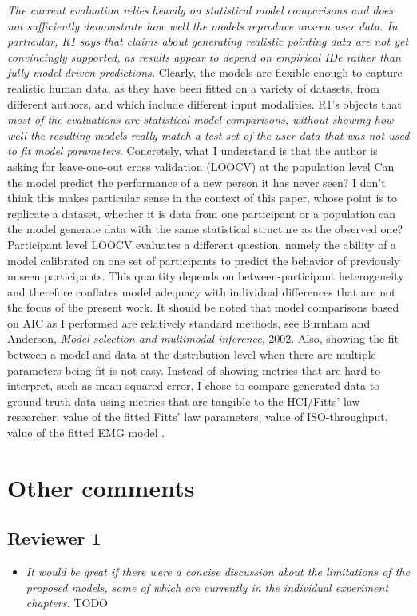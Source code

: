 \documentclass{article}
\begin{document}
\textit{The current evaluation relies heavily on statistical model comparisons and does not sufficiently demonstrate how well the models reproduce unseen user data.  In particular, R1 says that claims about generating realistic pointing data are not yet convincingly supported, as results appear to depend on empirical IDe rather than fully model-driven predictions.} Clearly, the models are flexible enough to capture realistic human data, as they have been fitted on a variety of datasets, from different authors, and which include different input modalities. R1's objects that \textit{most of the evaluations are statistical model comparisons, without showing how well the resulting models really match a test set of the user data that was not used to fit model parameters}. Concretely, what I understand is that the author is asking for leave-one-out cross validation (LOOCV) at the population level \ie Can the model predict the performance of a new person it has never seen? I don't think this makes particular sense in the context of this paper, whose point is to replicate a dataset, whether it is data from one participant or a population \ie can the model generate data with the same statistical structure as the observed one?
Participant level LOOCV evaluates a different question, namely the ability of a model calibrated on one set of participants to predict the behavior of previously unseen participants. This quantity depends on between-participant heterogeneity and therefore conflates model adequacy with individual differences that are not the focus of the present work.
It should be noted that model comparisons based on AIC as I performed are relatively standard methods, see \eg Burnham and Anderson, \textit{Model selection and multimodal inference}, 2002. Also, showing the fit between a model and data at the distribution level when there are multiple parameters being fit is not easy. Instead of showing metrics that are hard to interpret, such as mean squared error, I chose to compare generated data to ground truth data using metrics that are tangible to the HCI/Fitts' law researcher: value of the fitted Fitts' law parameters, value of ISO-throughput, value of the fitted EMG model \etc.
\section*{Other comments}

\subsection*{Reviewer 1}
\begin{itemize}
  \item \textit{It would be great if there were a concise discussion about the limitations of the proposed models, some of which are currently in the individual experiment chapters.} TODO
\end{itemize}
\end{document}
